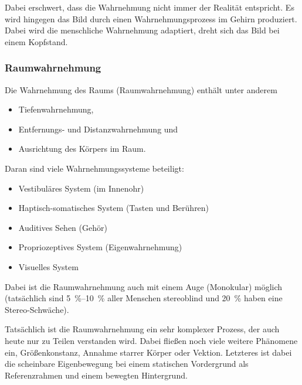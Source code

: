 			Dabei erschwert, dass die Wahrnehmung nicht immer der Realität entspricht. Es wird hingegen das Bild durch einen Wahrnehmungsprozess im Gehirn produziert. Dabei wird die menschliche Wahrnehmung adaptiert, \bspw dreht sich das Bild bei einem Kopfstand.

			\subsubsection{Raumwahrnehmung}
				Die Wahrnehmung des Raums (Raumwahrnehmung) enthält unter anderem
				\begin{itemize}
					\item Tiefenwahrnehmung,
					\item Entfernungs- und Distanzwahrnehmung und
					\item Ausrichtung des Körpers im Raum.
				\end{itemize}
				Daran sind viele Wahrnehmungssysteme beteiligt:
				\begin{itemize}
					\item Vestibuläres System (im Innenohr)
					\item Haptisch-somatisches System (Tasten und Berühren)
					\item Auditives Sehen (Gehör)
					\item Propriozeptives System (Eigenwahrnehmung)
					\item Visuelles System
				\end{itemize}

				Dabei ist die Raumwahrnehmung auch mit einem Auge (Monokular) möglich (tatsächlich sind \SIrange{5}{10}{\percent} aller Menschen stereoblind und \SI{20}{\percent} haben eine Stereo-Schwäche).

				Tatsächlich ist die Raumwahrnehmung ein sehr komplexer Prozess, der auch heute nur zu Teilen verstanden wird. Dabei fließen noch viele weitere Phänomene ein, \zB Größenkonstanz, Annahme starrer Körper oder Vektion. Letzteres ist dabei die scheinbare Eigenbewegung bei einem statischen Vordergrund als Referenzrahmen und einem bewegten Hintergrund.

